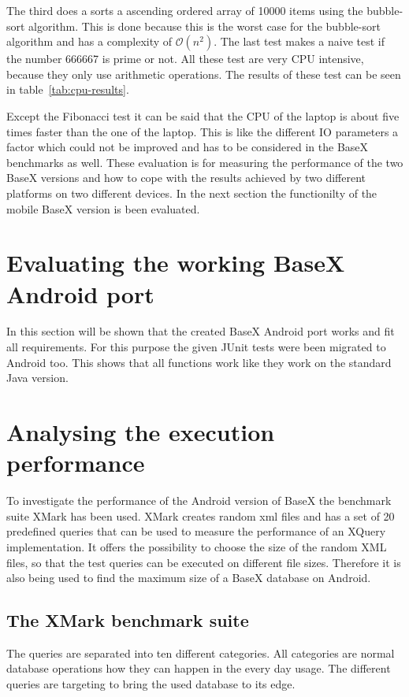 The third does a sorts a ascending ordered array of 10000 items using the bubble-sort algorithm.
This is done because this is the worst case for the bubble-sort algorithm and has a complexity of $\mathcal O(n^2)$.
The last test makes a naive test if the number 666667 is prime or not.
All these test are very CPU intensive, because they only use arithmetic operations.
The results of these test can be seen in table~\ref{tab:cpu-results}.

Except the Fibonacci test it can be said that the CPU of the laptop is about five times faster than the one of the laptop.
This is like the different IO parameters a factor which could not be improved and has to be considered in the BaseX benchmarks as well.
These evaluation is for measuring the performance of the two BaseX versions and how to cope with the results achieved by two different platforms on two different devices.
In the next section the functionilty of the mobile BaseX version is been evaluated.



\section{Evaluating the working BaseX Android port}
\label{sec:evaluating-the-working-basex-android-port}
In this section will be shown that the created BaseX Android port works and fit all requirements.
For this purpose the given JUnit tests were been migrated to Android too.
This shows that all functions work like they work on the standard Java version.


\section{Analysing the execution performance}
\label{sec:analysing-the-execution-performance}
To investigate the performance of the Android version of BaseX the benchmark suite XMark has been used.
XMark creates random xml files and has a set of 20 predefined queries that can be used to measure the performance of an XQuery implementation.
It offers the possibility to choose the size of the random XML files, so that the test queries can be executed on different file sizes.
Therefore it is also being used to find the maximum size of a BaseX database on Android.

\subsection{The XMark benchmark suite}
\label{subsec:the-xmark-benchmark-suite}
The queries are separated into ten different categories.
All categories are normal database operations how they can happen in the every day usage.
The different queries are targeting to bring the used database to its edge.

